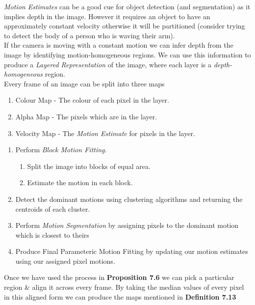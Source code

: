 \documentclass[11pt,a4paper]{article}
\begin{document}
\textit{Motion Estimates} can be a good cue for object detection (and segmentation) as it implies depth in the image. However it requires an object to have an approximately constant velocity otherwise it will be partitioned (consider trying to detect the body of a person who is waving their arm).\\

If the camera is moving with a constant motion we can infer depth from the image by identifying motion-homogeneous regions. We can use this information to produce a \textit{Layered Representation} of the image, where each layer is a \textit{depth-homogeneous} region.\\

Every frame of an image can be split into three maps
\begin{enumerate}
	\item Colour Map - The colour of each pixel in the layer.
	\item Alpha Map - The pixels which are in the layer.
	\item Velocity Map - The \textit{Motion Estimate} for pixels in the layer.
\end{enumerate}

\begin{enumerate}
	\item Perform \textit{Block Motion Fitting}.\\
	\begin{enumerate}
		\item Split the image into blocks of equal area.
		\item Estimate the motion in each block.
	\end{enumerate}
	\item Detect the dominant motions using clustering algorithms and returning the centroids of each cluster.
	\item Perform \textit{Motion Segmentation} by assigning pixels to the dominant motion which is closest to theirs
	\item Produce Final Parameteric Motion Fitting by updating our motion estimates using our assigned pixel motions.
\end{enumerate}

Once we have used the process in \textbf{Proposition 7.6} we can pick a particular region \& align it across every frame. By taking the median values of every pixel in this aligned form we can produce the maps mentioned in \textbf{Definition 7.13}
\end{document}
